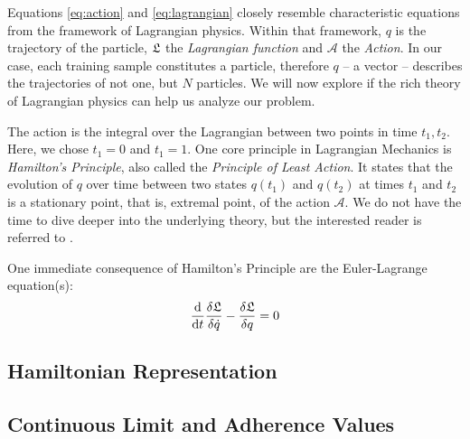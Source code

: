 Equations \ref{eq:action} and \ref{eq:lagrangian} closely resemble characteristic equations from the framework of Lagrangian physics.
Within that framework, $q$ is the trajectory of the particle, $\mathfrak{L}$ the \emph{Lagrangian function} and $\mathcal{A}$ the \emph{Action}.
In our case, each training sample constitutes a particle, therefore $q$ -- a vector -- describes the trajectories of not one, but $N$ particles.
We will now explore if the rich theory of Lagrangian physics can help us analyze our problem.

The action is the integral over the Lagrangian between two points in time $t_1, t_2$.
Here, we chose $t_1 = 0$ and $t_1 = 1$.
One core principle in Lagrangian Mechanics is \emph{Hamilton's Principle}, also called the \emph{Principle of Least Action}.
It states that
the evolution of $q$ over time between two states $q(t_1)$ and $q(t_2)$ at times $t_1$ and $t_2$ is a stationary point, that is, extremal point, of the action $\mathcal{A}$.
We do not have the time to dive deeper into the underlying theory, but the interested reader is referred to .

One immediate consequence of Hamilton's Principle are the Euler-Lagrange equation(s):
\begin{equation}
	\frac{\mathrm{d}}{\mathrm{d}t} \frac{\delta \mathfrak{L}}{\delta \dot{q}} - \frac{\delta \mathfrak{L}}{\delta q} = 0
\end{equation}



\subsection{Hamiltonian Representation}

\subsection{Continuous Limit and Adherence Values}